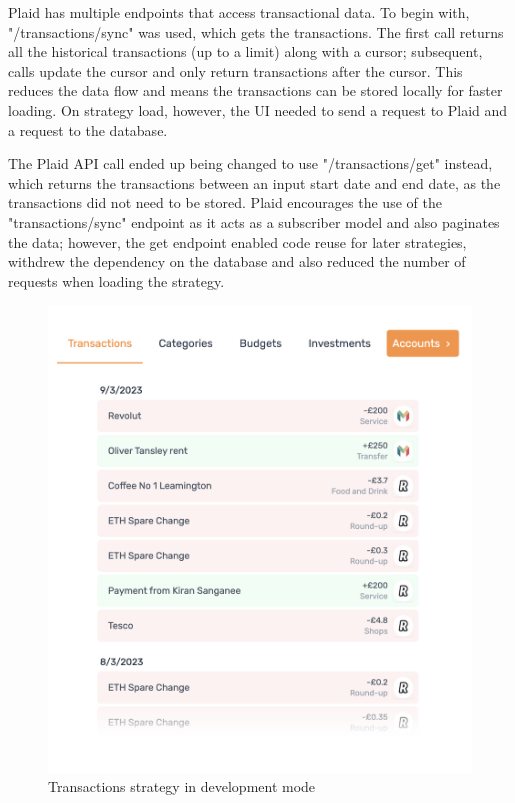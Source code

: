 Plaid has multiple endpoints that access transactional data. To begin with, "/transactions/sync" was used, which gets the transactions. The first call returns all the historical transactions (up to a limit) along with a cursor; subsequent, calls update the cursor and only return transactions after the cursor. This reduces the data flow and means the transactions can be stored locally for faster loading. On strategy load, however, the UI needed to send a request to Plaid and a request to the database.

The Plaid API call ended up being changed to use "/transactions/get" instead, which returns the transactions between an input start date and end date, as the transactions did not need to be stored. Plaid encourages the use of the "transactions/sync" endpoint as it acts as a subscriber model and also paginates the data; however, the get endpoint enabled code reuse for later strategies, withdrew the dependency on the database and also reduced the number of requests when loading the strategy.

\begin{figure}[H]
	\centering
	\includegraphics[width=\textwidth]{images/transactions_development.png}
	\caption{Transactions strategy in development mode}
	\label{fig:TransactionsStrategy}
\end{figure}

